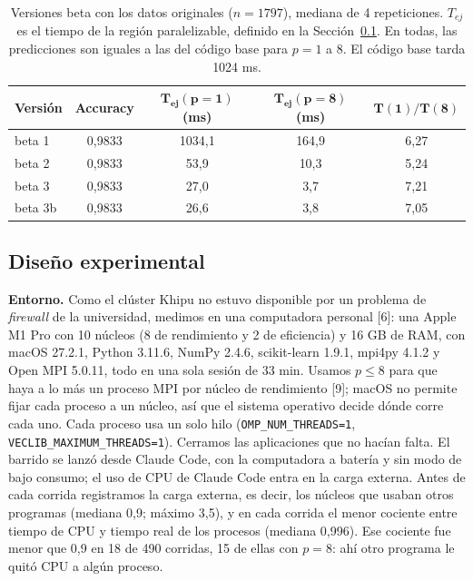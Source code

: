 \documentclass[11pt,a4paper]{article}
\begin{document}
\begin{table}[!htb]
\centering
\small
\begin{tabular}{lcccc}
\toprule
\textbf{Versión} & \textbf{Accuracy} & $\mathbf{T_{ej}(p{=}1)}$ \textbf{(ms)} & $\mathbf{T_{ej}(p{=}8)}$ \textbf{(ms)} & $\mathbf{T(1)/T(8)}$ \\
\midrule
beta 1 & 0,9833 & 1034,1 & 164,9 & 6,27 \\
beta 2 & 0,9833 & 53,9 & 10,3 & 5,24 \\
beta 3 & 0,9833 & 27,0 & 3,7 & 7,21 \\
beta 3b & 0,9833 & 26,6 & 3,8 & 7,05 \\
\bottomrule
\end{tabular}
\caption{Versiones beta con los datos originales ($n = 1797$), mediana de 4 repeticiones. $T_{ej}$ es el tiempo de la región paralelizable, definido en la Sección~\ref{sec:experimental}. En todas, las predicciones son iguales a las del código base para $p = 1$ a $8$. El código base tarda 1024 ms.}
\label{tab:betas}
\end{table}

\subsection{Diseño experimental}
\label{sec:experimental}

\textbf{Entorno.} Como el clúster Khipu no estuvo disponible por un problema de \textit{firewall} de la universidad, medimos en una computadora personal [6]: una Apple M1 Pro con 10 núcleos (8 de rendimiento y 2 de eficiencia) y 16 GB de RAM, con macOS 27.2.1, Python 3.11.6, NumPy 2.4.6, scikit-learn 1.9.1, mpi4py 4.1.2 y Open MPI 5.0.11, todo en una sola sesión de 33 min. Usamos $p \le 8$ para que haya a lo más un proceso MPI por núcleo de rendimiento [9]; macOS no permite fijar cada proceso a un núcleo, así que el sistema operativo decide dónde corre cada uno. Cada proceso usa un solo hilo (\texttt{OMP\_NUM\_THREADS=1}, \texttt{VECLIB\_MAXIMUM\_THREADS=1}). Cerramos las aplicaciones que no hacían falta. El barrido se lanzó desde Claude Code, con la computadora a batería y sin modo de bajo consumo; el uso de CPU de Claude Code entra en la carga externa. Antes de cada corrida registramos la carga externa, es decir, los núcleos que usaban otros programas (mediana 0,9; máximo 3,5), y en cada corrida el menor cociente entre tiempo de CPU y tiempo real de los procesos (mediana 0,996). Ese cociente fue menor que 0,9 en 18 de 490 corridas, 15 de ellas con $p = 8$: ahí otro programa le quitó CPU a algún proceso.
\end{document}
